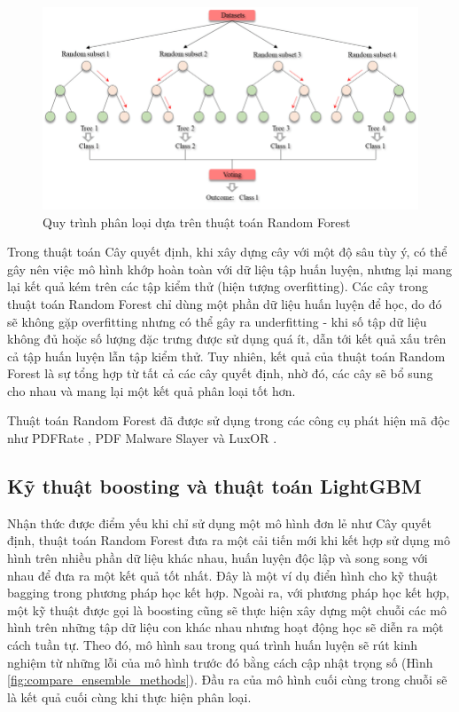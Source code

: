 \documentclass[./../main.tex]{subfiles}
\begin{document}
\begin{figure}[ht!]
	\centering
	\includegraphics[width=\linewidth]{./images/img_rf_flow.png}
	\caption{Quy trình phân loại dựa trên thuật toán Random Forest \cite{randomforest}}
	\label{fig:img_rf_flow}
\end{figure}

Trong thuật toán Cây quyết định, khi xây dựng cây với một độ sâu tùy ý, có thể gây nên việc mô hình khớp hoàn toàn với dữ liệu tập huấn luyện, nhưng lại mang lại kết quả kém trên các tập kiểm thử (hiện tượng overfitting). Các cây trong thuật toán Random Forest chỉ dùng một phần dữ liệu huấn luyện để học, do đó sẽ không gặp overfitting nhưng có thể gây ra underfitting - khi số tập dữ liệu không đủ hoặc số lượng đặc trưng được sử dụng quá ít, dẫn tới kết quả xấu trên cả tập huấn luyện lẫn tập kiểm thử. Tuy nhiên, kết quả của thuật toán Random Forest là sự tổng hợp từ tất cả các cây quyết định, nhờ đó, các cây sẽ bổ sung cho nhau và mang lại một kết quả phân loại tốt hơn.

Thuật toán Random Forest đã được sử dụng trong các công cụ phát hiện mã độc như PDFRate \cite{pdfrate}, PDF Malware Slayer \cite{slayer} và LuxOR \cite{luxor}.

\subsection{Kỹ thuật boosting và thuật toán LightGBM}
Nhận thức được điểm yếu khi chỉ sử dụng một mô hình đơn lẻ như Cây quyết định, thuật toán Random Forest đưa ra một cải tiến mới khi kết hợp sử dụng mô hình trên nhiều phần dữ liệu khác nhau, huấn luyện độc lập và song song với nhau để đưa ra một kết quả tốt nhất. Đây là một ví dụ điển hình cho kỹ thuật bagging trong phương pháp học kết hợp. Ngoài ra, với phương pháp học kết hợp, một kỹ thuật được gọi là boosting cũng sẽ thực hiện xây dựng một chuỗi các mô hình trên những tập dữ liệu con khác nhau nhưng hoạt động học sẽ diễn ra một cách tuần tự. Theo đó, mô hình sau trong quá trình huấn luyện sẽ rút kinh nghiệm từ những lỗi của mô hình trước đó bằng cách cập nhật trọng số (Hình \ref{fig:compare_ensemble_methods}). Đầu ra của mô hình cuối cùng trong chuỗi sẽ là kết quả cuối cùng khi thực hiện phân loại.
\end{document}
